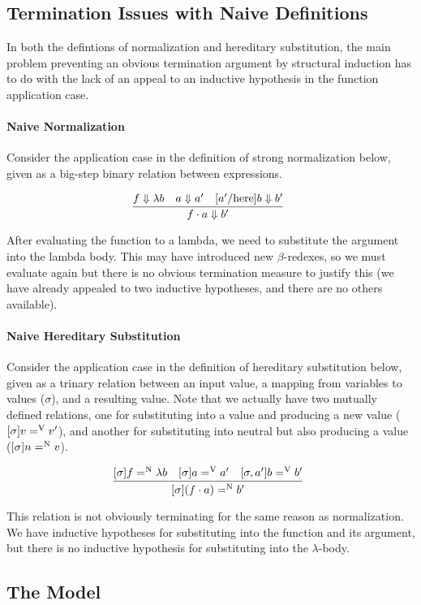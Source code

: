\documentclass{llncs}
\def\bigstep{\Downarrow}
\def\app{\cdot}
\def\lam{\lambda}
\newcommand{\hsubn}[2]{[\sigma]#1=^\con{N}#2}
\newcommand{\hsub}[2]{[\sigma]#1=^\con{V}#2}
\newcommand{\hsubext}[3]{[\sigma, #1]#2=^\con{V}#3}
\newcommand{\con}[1]{\textmd{#1}}
\begin{document}
\subsection{Termination Issues with Naive Definitions}

In both the defintions of normalization and hereditary substitution, the
main problem preventing an obvious termination
argument by structural induction has to do with the lack of an appeal
to an inductive hypothesis in the function application case.

\paragraph{Naive Normalization}
Consider the application case in the definition of strong normalization
below, given as a big-step binary relation between expressions.

$$
\infer
  []{f \app a \bigstep {b'}}
{
  f \bigstep \lam b
  &
  a \bigstep a'
  &
  [a'/\con{here}]b \bigstep b'
}
$$

After evaluating the function to a lambda, we need to
substitute the argument into the lambda body. This may have introduced
new $\beta$-redexes, so we must evaluate again but
there is no obvious termination measure to justify this (we have
already appealed to two inductive hypotheses, and there are no others
available).

\paragraph{Naive Hereditary Substitution}
Consider the application case in the definition of hereditary substitution
below, given as a trinary relation between an input value, a mapping from
variables to values ($\sigma$), and a resulting value. Note that we
actually have two mutually defined relations, one for substituting
into a value and producing a new value ($\hsub{v}{v'}$), and another
for substituting into neutral but also producing a value
($\hsubn{n}{v}$).

$$
\infer
   []{\hsubn{(f \app a)}{b'}}
{
  \hsubn{f}{\lam b}
  &
  \hsub{a}{a'}
  &
  \hsubext{a'}{b}{b'}
}
$$

This relation is not obviously terminating for the same reason as
normalization. We have inductive hypotheses for substituting into the
function and its argument, but there is no inductive hypothesis for
substituting into the $\lambda$-body.

\subsection{The Model}
\end{document}
